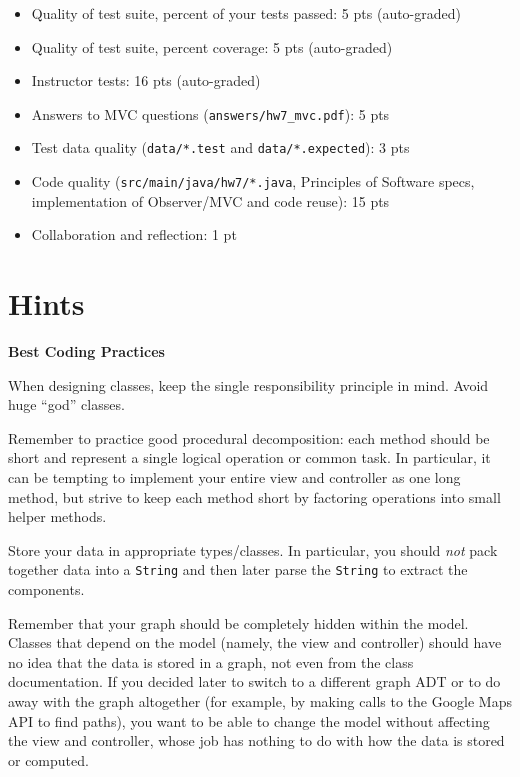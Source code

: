 \documentclass[11pt]{article}
\begin{document}
\newpage

\begin{itemize}
\item Quality of test suite, percent of your tests passed: 5 pts (auto-graded)
\item Quality of test suite, percent coverage: 5 pts (auto-graded)
\item Instructor tests: 16 pts (auto-graded)
\item Answers to MVC questions (\texttt{answers/hw7\_mvc.pdf}): 5 pts
\item Test data quality (\texttt{data/*.test} and \texttt{data/*.expected}): 3 pts
\item Code quality (\texttt{src/main/java/hw7/*.java}, Principles of Software specs, implementation of Observer/MVC and code reuse): 15 pts
\item Collaboration and reflection: 1 pt
\end{itemize}

\section*{Hints}
\label{sec:Hints}
\large{\textbf{Best Coding Practices}}

\noindent When designing classes, keep the single responsibility principle in mind. Avoid huge “god” classes.

\noindent Remember to practice good procedural decomposition: each method should be short and represent a single logical operation or common task. In particular, it can be tempting to implement your entire view and controller as one long method, but strive to keep each method short by factoring operations into small helper methods.

\noindent Store your data in appropriate types/classes. In particular, you should \textit{not} pack together data into a \texttt{String} and then later parse the \texttt{String} to extract the components.

\noindent Remember that your graph should be completely hidden within the model. Classes that depend on the model (namely, the view and controller) should have no idea that the data is stored in a graph, not even from the class documentation. If you decided later to switch to a different graph ADT or to do away with the graph altogether (for example, by making calls to the Google Maps API to find paths), you want to be able to change the model without affecting the view and controller, whose job has nothing to do with how the data is stored or computed.
\end{document}
